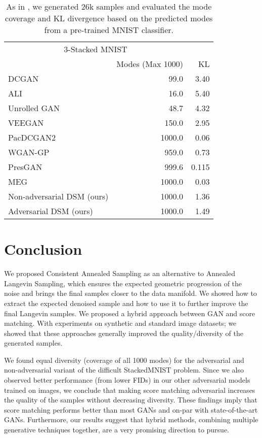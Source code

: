 \documentclass{article} \usepackage{iclr2021_conference_notitle,times}
\theoremstyle{definition}
\theoremstyle{definition}
\begin{document}
\begin{table}[ht]
	\begin{center}
  	\begin{tabular}{ l  r  r    }
  		\hline
		\multicolumn{2}{c}{3-Stacked MNIST}  \\ \cline{2-3} & Modes (Max 1000)& KL \\ \hline DCGAN \citep{DCGAN} 	& 99.0 & 3.40 		\\ALI  \citep{dumoulin2016adversarially} & 16.0 &  5.40 		\\Unrolled GAN \citep{metz2016unrolled} & 48.7 & 4.32 		\\VEEGAN \citep{srivastava2017veegan} 		& 150.0 &  2.95		\\PacDCGAN2 \citep{pacgan} 	& 1000.0 & 0.06  \\
		    WGAN-GP \citep{kumar2019maximum,WGAN-GP} & 959.0 & 0.73 \\ 
		    PresGAN \citep{dieng2019prescribed} & 999.6 & 0.115 \\
		    MEG \citep{kumar2019maximum} & 1000.0 & 0.03 \\
		    \hline
		    Non-adversarial DSM (ours) 	& 1000.0 & 1.36 \\
		    Adversarial DSM (ours) 	& 1000.0 & 1.49 \\
    		\hline
  	\end{tabular}
	\end{center}
	\caption{As in \citet{lin2018pacgan}, we generated 26k samples and evaluated the mode coverage and KL divergence based on the predicted modes from a pre-trained MNIST classifier.
	}
	\label{fig:stacked}
\end{table}


\section{Conclusion}

We proposed Consistent Annealed Sampling as an alternative to Annealed Langevin Sampling, which ensures the expected geometric progression of the noise and brings the final samples closer to the data manifold. We showed how to extract the expected denoised sample and how to use it to further improve the final Langevin samples. We proposed a hybrid approach between GAN and score matching. With experiments on synthetic and standard image datasets; we showed that these approaches generally improved the quality/diversity of the generated samples.

We found equal diversity (coverage of all 1000 modes) for the adversarial and non-adversarial variant of the difficult StackedMNIST problem. Since we also observed better performance (from lower FIDs) in our other adversarial models trained on images, we conclude that making score matching adversarial increases the quality of the samples without decreasing diversity. 
These findings imply that score matching performs better than most GANs and on-par with state-of-the-art GANs. Furthermore, our results suggest that hybrid methods, combining multiple generative techniques together, are a very promising direction to pursue.
\end{document}
